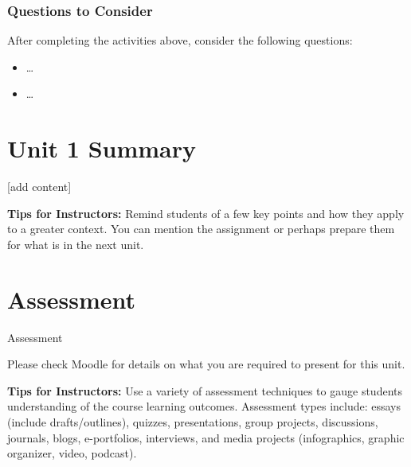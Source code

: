 \documentclass[
]{book}
\providecommand{\tightlist}{%
  \setlength{\itemsep}{0pt}\setlength{\parskip}{0pt}}
\begin{document}
\hypertarget{questions-to-consider-3}{%
\subsubsection*{Questions to Consider}\label{questions-to-consider-3}}

After completing the activities above, consider the following questions:

\begin{itemize}
\tightlist
\item
  \ldots{}\\
\item
  \ldots{}
\end{itemize}

\hypertarget{unit-1-summary}{%
\section*{Unit 1 Summary}\label{unit-1-summary}}

{[}add content{]}

\begin{feedback}
\textbf{Tips for Instructors:}
Remind students of a few key points and how they apply to a greater context. You can mention the assignment or perhaps prepare them for what is in the next unit.
\end{feedback}

\hypertarget{assessment-2}{%
\section*{Assessment}\label{assessment-2}}

\begin{assessment}
{Assessment}

Please check Moodle for details on what you are required to present for this unit.
\end{assessment}

\begin{feedback}
\textbf{Tips for Instructors:}
Use a variety of assessment techniques to gauge students understanding of the course learning outcomes. Assessment types include: essays (include drafts/outlines), quizzes, presentations, group projects, discussions, journals, blogs, e-portfolios, interviews, and media projects (infographics, graphic organizer, video, podcast).
\end{feedback}
\end{document}
